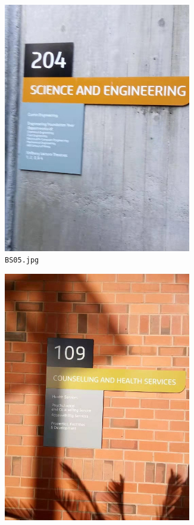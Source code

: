 \documentclass{article}
\begin{document}
\begin{figure}[h]
\begin{subfigure}[t]{0.22\textwidth}
    \includegraphics[width=0.9\textwidth]{../train/task1/BS05}
    \caption[BS05]{
      \lstinline{BS05.jpg}
    }
    \label{fig:bs05}
  \end{subfigure}
  \begin{subfigure}[t]{0.22\textwidth}
    \centering
    \includegraphics[width=0.9\textwidth]{../train/task1/BS07}

\end{subfigure}
\end{figure}
\end{document}
